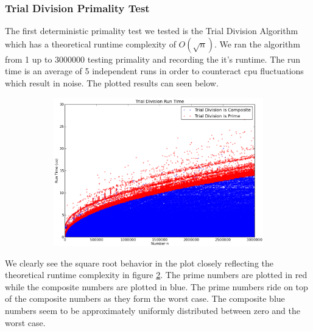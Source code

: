 \documentclass[compressed,final,notitlepage,narroweqnarray,inline,twoside,]{ieee}
\begin{document}
\subsubsection{Trial Division Primality Test}
The first deterministic primality test we tested is the Trial Division Algorithm which has a theoretical runtime complexity of $O(\sqrt{n})$. We ran the algorithm from 1 up to 3000000 testing primality and recording the it’s runtime. The run time is an average of 5 independent runs in order to counteract cpu fluctuations which result in noise. The plotted results can seen below. 
\begin{figure}
        \centering
        \begin{subfigure}[b]{0.5\textwidth}
                \includegraphics[width=\textwidth]{../images/isPrime}
                \label{fig:gull}
        \end{subfigure}
        \vspace{-30pt}\caption{}\label{fig:trial_devision}
\end{figure}
We clearly see the square root behavior in the plot closely reflecting the theoretical runtime complexity in figure \ref{fig:trial_devision}. The prime numbers are plotted in red while the composite numbers are plotted in blue. The prime numbers ride on top of the composite numbers as they form the worst case. The composite blue numbers seem to be approximately uniformly distributed between zero and the worst case.
\end{document}
